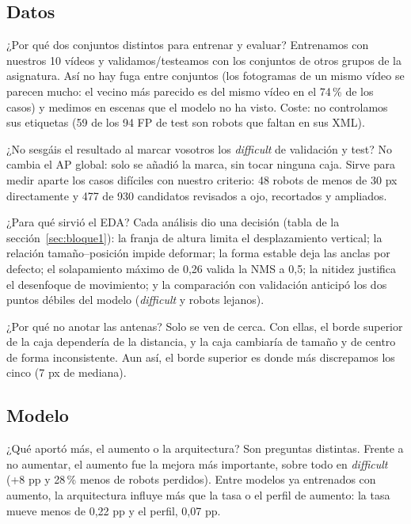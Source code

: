 \documentclass[11pt,a4paper]{article}
\begin{document}
\subsection*{Datos}

\begin{pregunta}{¿Por qué dos conjuntos distintos para entrenar y evaluar?}
Entrenamos con nuestros 10 vídeos y validamos/testeamos con los conjuntos de otros grupos de la asignatura. Así no hay fuga entre conjuntos (los fotogramas de un mismo vídeo se parecen mucho: el vecino más parecido es del mismo vídeo en el 74\,\% de los casos) y medimos en escenas que el modelo no ha visto. Coste: no controlamos sus etiquetas (59 de los 94 FP de test son robots que faltan en sus XML).
\end{pregunta}

\begin{pregunta}{¿No sesgáis el resultado al marcar vosotros los \emph{difficult} de validación y test?}
No cambia el AP global: solo se añadió la marca, sin tocar ninguna caja. Sirve para medir aparte los casos difíciles con nuestro criterio: 48 robots de menos de 30 px directamente y 477 de 930 candidatos revisados a ojo, recortados y ampliados.
\end{pregunta}

\begin{pregunta}{¿Para qué sirvió el EDA?}
Cada análisis dio una decisión (tabla de la sección~\ref{sec:bloque1}): la franja de altura limita el desplazamiento vertical; la relación tamaño--posición impide deformar; la forma estable deja las anclas por defecto; el solapamiento máximo de 0,26 valida la NMS a 0,5; la nitidez justifica el desenfoque de movimiento; y la comparación con validación anticipó los dos puntos débiles del modelo (\emph{difficult} y robots lejanos).
\end{pregunta}

\begin{pregunta}{¿Por qué no anotar las antenas?}
Solo se ven de cerca. Con ellas, el borde superior de la caja dependería de la distancia, y la caja cambiaría de tamaño y de centro de forma inconsistente. Aun así, el borde superior es donde más discrepamos los cinco (7 px de mediana).
\end{pregunta}

\subsection*{Modelo}

\begin{pregunta}{¿Qué aportó más, el aumento o la arquitectura?}
Son preguntas distintas. Frente a no aumentar, el aumento fue la mejora más importante, sobre todo en \emph{difficult} (+8 pp y 28\,\% menos de robots perdidos). Entre modelos ya entrenados con aumento, la arquitectura influye más que la tasa o el perfil de aumento: la tasa mueve menos de 0,22 pp y el perfil, 0,07 pp.
\end{pregunta}
\end{document}

